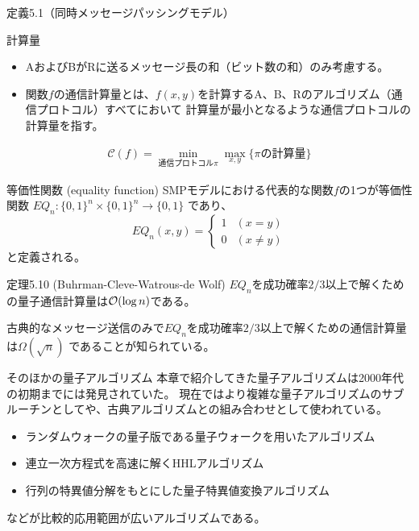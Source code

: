 \documentclass[14pt,aspectratio=169,xcolor=dvipsnames,table,dvipdfmx]{beamer}
\theoremstyle{definition}
\begin{document}
\begin{frame}{定義5.1（同時メッセージパッシングモデル）}
  \begin{block}{計算量}
    \begin{itemize}
      \item AおよびBがRに送るメッセージ長の和（ビット数の和）のみ考慮する。
      \item 関数$f$の通信計算量とは、$f(x,y)$を計算するA、B、Rのアルゴリズム（通信プロトコル）すべてにおいて
            計算量が最小となるような通信プロトコルの計算量を指す。
    \end{itemize}
  \end{block}
  \begin{align*}
    \mathcal{C}(f) = \min_{\text{通信プロトコル$\pi$}}\max_{x,y}\{\text{$\pi$の計算量}\}
  \end{align*}
\end{frame}

\begin{frame}{等価性関数 (equality function)}
  SMPモデルにおける代表的な関数$f$の1つが等価性関数
  $EQ_{n} \colon \{0,1\}^{n}\times\{0,1\}^{n}\rightarrow\{0,1\}$
  であり、
  \begin{equation}
    EQ_{n}(x,y) = 
    \begin{cases}
      1 & (x=y) \\
      0 & (x\neq y)
    \end{cases}
  \end{equation}
  と定義される。
  \begin{alertblock}{定理5.10 (Buhrman-Cleve-Watrous-de Wolf)}
    $EQ_{n}$を成功確率$2/3$以上で解くための量子通信計算量は$\order{\log{n}}$である。
  \end{alertblock}
  古典的なメッセージ送信のみで$EQ_n$を成功確率$2/3$以上で解くための通信計算量は$\Omega(\sqrt{n})$
  であることが知られている。
\end{frame}

\begin{frame}{そのほかの量子アルゴリズム}
  本章で紹介してきた量子アルゴリズムは2000年代の初期までには発見されていた。
  現在ではより複雑な量子アルゴリズムのサブルーチンとしてや、古典アルゴリズムとの組み合わせとして使われている。
  \vfill
  \begin{itemize}
    \item ランダムウォークの量子版である量子ウォークを用いたアルゴリズム
    \item 連立一次方程式を高速に解くHHLアルゴリズム
    \item 行列の特異値分解をもとにした量子特異値変換アルゴリズム
  \end{itemize}
  \vfill
  などが比較的応用範囲が広いアルゴリズムである。
\end{frame}
\end{document}
